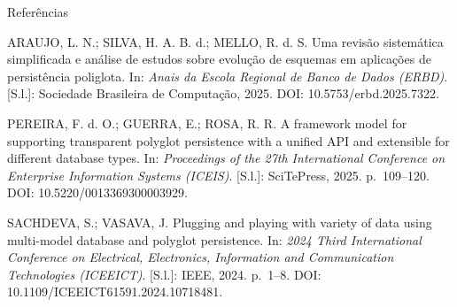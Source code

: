 \begin{frame}{Referências}
  \footnotesize\raggedright
  \setlength{\parskip}{6pt}
  ARAUJO, L. N.; SILVA, H. A. B. d.; MELLO, R. d. S. Uma revisão sistemática simplificada e
  análise de estudos sobre evolução de esquemas em aplicações de persistência poliglota. In:
  \textit{Anais da Escola Regional de Banco de Dados (ERBD)}. [S.l.]: Sociedade Brasileira de
  Computação, 2025. DOI: 10.5753/erbd.2025.7322.\par
  PEREIRA, F. d. O.; GUERRA, E.; ROSA, R. R. A framework model for supporting transparent
  polyglot persistence with a unified API and extensible for different database types. In:
  \textit{Proceedings of the 27th International Conference on Enterprise Information Systems
  (ICEIS)}. [S.l.]: SciTePress, 2025. p.~109--120. DOI: 10.5220/0013369300003929.\par
  SACHDEVA, S.; VASAVA, J. Plugging and playing with variety of data using multi-model
  database and polyglot persistence. In: \textit{2024 Third International Conference on
  Electrical, Electronics, Information and Communication Technologies (ICEEICT)}. [S.l.]:
  IEEE, 2024. p.~1--8. DOI: 10.1109/ICEEICT61591.2024.10718481.\par
\end{frame}
